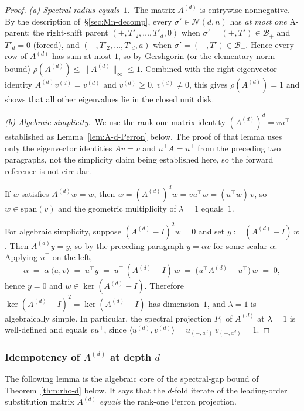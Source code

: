 \documentclass{amsart}
\theoremstyle{definition}
\theoremstyle{remark}
\begin{document}
\begin{proof}
\smallskip\noindent\emph{(a) Spectral radius equals~$1$.}\ The
matrix $A^{(d)}$ is entrywise nonnegative.  By the description
of~\S\ref{sec:Mn-decomp}, every $\sigma' \in \mathcal{N}(d, n)$
has \emph{at most one} A-parent: the right-shift parent
$(+, T'_2, \ldots, T'_d, 0)$ when $\sigma' = (+, T') \in
\mathcal{B}_+$ and $T'_d = 0$ (forced), and
$(-, T'_2, \ldots, T'_d, a)$ when $\sigma' = (-, T') \in
\mathcal{B}_-$.  Hence every row of $A^{(d)}$ has sum at most
$1$, so by Gershgorin (or the elementary norm bound)
$\rho(A^{(d)}) \le \|A^{(d)}\|_\infty \le 1$.  Combined with the
right-eigenvector identity $A^{(d)} v^{(d)} = v^{(d)}$ and
$v^{(d)} \ge 0$, $v^{(d)} \ne 0$, this gives
$\rho(A^{(d)}) = 1$ and shows that all other eigenvalues lie in
the closed unit disk.

\smallskip\noindent\emph{(b) Algebraic simplicity.}\ We use the
rank-one matrix identity $(A^{(d)})^d = v u^{\top}$ established
as Lemma~\ref{lem:A-d-Perron} below.  The proof of that lemma
uses only the eigenvector identities $A v = v$ and $u^{\top} A
= u^{\top}$ from the preceding two paragraphs, not the
simplicity claim being established here, so the forward
reference is not circular.

If $w$ satisfies $A^{(d)} w = w$, then $w = (A^{(d)})^{d} w =
v u^{\top} w = (u^{\top} w)\, v$, so $w \in \mathrm{span}(v)$
and the geometric multiplicity of $\lambda = 1$ equals~$1$.

For algebraic simplicity, suppose $(A^{(d)} - I)^{2} w = 0$ and
set $y := (A^{(d)} - I)\, w$.  Then $A^{(d)} y = y$, so by the
preceding paragraph $y = \alpha v$ for some scalar $\alpha$.
Applying $u^{\top}$ on the left,
\[
  \alpha \;=\; \alpha\, \langle u, v\rangle
  \;=\; u^{\top} y
  \;=\; u^{\top}\,(A^{(d)} - I)\, w
  \;=\; \bigl(u^{\top} A^{(d)} - u^{\top}\bigr)\, w
  \;=\; 0,
\]
hence $y = 0$ and $w \in \ker(A^{(d)} - I)$.  Therefore
$\ker(A^{(d)} - I)^{2} = \ker(A^{(d)} - I)$ has dimension~$1$,
and $\lambda = 1$ is algebraically simple.  In particular, the
spectral projection $P_1$ of $A^{(d)}$ at $\lambda = 1$ is
well-defined and equals $v u^{\top}$, since
$\langle u^{(d)}, v^{(d)}\rangle = u_{(-, a^d)}\, v_{(-, a^d)}
= 1$.
\end{proof}

\subsubsection{Idempotency of $A^{(d)}$ at depth $d$}
\label{ssec:A-idempotent}

The following lemma is the algebraic core of the
spectral-gap bound of
Theorem~\ref{thm:rho-d} below.  It says that the
$d$-fold iterate of the leading-order substitution matrix
$A^{(d)}$ \emph{equals} the rank-one Perron projection.
\end{document}
